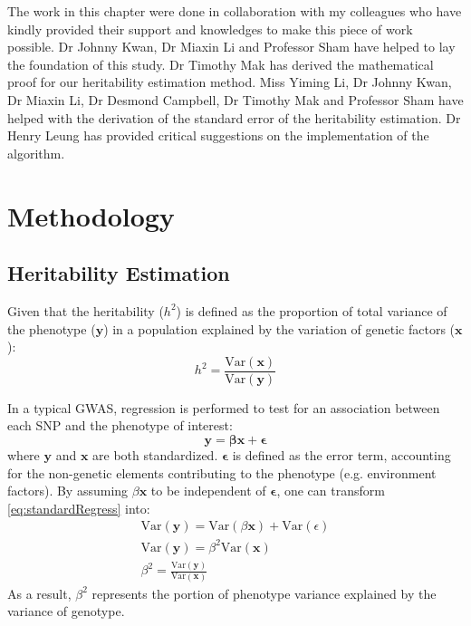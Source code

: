 	The work in this chapter were done in collaboration with my colleagues who have kindly provided their support and knowledges to make this piece of work possible.
	Dr Johnny Kwan, Dr Miaxin Li and Professor Sham have helped to lay the foundation of this study. 
	Dr Timothy Mak has derived the mathematical proof for our heritability estimation method. 
	Miss Yiming Li, Dr Johnny Kwan, Dr Miaxin Li, Dr Desmond Campbell, Dr Timothy Mak and Professor Sham have helped with the derivation of the standard error of the heritability estimation. 
	Dr Henry Leung has provided critical suggestions on the implementation of the algorithm.
	
	\section{Methodology}			
		\subsection{Heritability Estimation}
			Given that the heritability ($h^2$) is defined as the proportion of total variance of the phenotype ($\boldsymbol{y}$) in a population explained by the variation of genetic factors ($\boldsymbol{x}$):
			$$
				h^2 = \frac{\mathrm{Var}(\boldsymbol{x})}{\mathrm{Var}(\boldsymbol{y})}
			$$
			
			In a typical \gls{GWAS}, regression is performed to test for an association between each \gls{SNP} and the phenotype of interest:
			\begin{equation}
				\boldsymbol{y}=\boldsymbol{\beta x}+\boldsymbol{\epsilon}
				\label{eq:standardRegress}
			\end{equation}
			where $\boldsymbol{y}$ and $\boldsymbol{x}$ are both standardized.
			$\boldsymbol{\epsilon}$ is defined as the error term, accounting for the non-genetic elements contributing to the phenotype (e.g. environment factors).
			By assuming $\beta \boldsymbol{x}$ to be independent of $\boldsymbol{\epsilon}$, one can transform \cref{eq:standardRegress} into:
			\begin{align}
				\mathrm{Var}(\boldsymbol{y}) = \mathrm{Var}(\beta \boldsymbol{x})+ \mathrm{Var}(\epsilon) \nonumber\\
				\mathrm{Var}(\boldsymbol{y}) = \beta^2\mathrm{Var}(\boldsymbol{x}) \nonumber\\
				\beta^2= \frac{\mathrm{Var}(\boldsymbol{y})}{\mathrm{Var}(\boldsymbol{x})}
				\label{eq:betaHeri}
			\end{align}
			As a result, $\beta^2$ represents the portion of phenotype variance explained by the variance of genotype.
					
